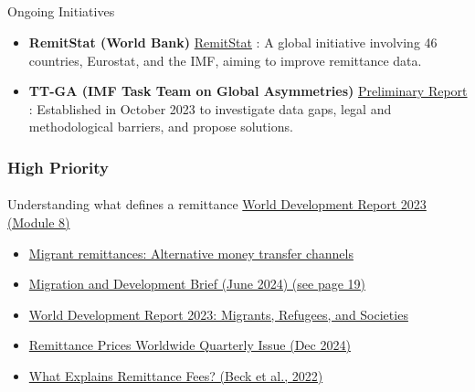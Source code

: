 \documentclass[
  11pt,
]{article}
\makeatletter
\let\oldparagraph\paragraph
\renewcommand{\paragraph}{
    \@ifstar
      \xxxParagraphStar
      \xxxParagraphNoStar
  }
\newcommand{\xxxParagraphStar}[1]{\oldparagraph*{#1}\mbox{}}
\newcommand{\xxxParagraphNoStar}[1]{\oldparagraph{#1}\mbox{}}
\let\oldsubparagraph\subparagraph
\renewcommand{\subparagraph}{
    \@ifstar
      \xxxSubParagraphStar
      \xxxSubParagraphNoStar
  }
\newcommand{\xxxSubParagraphStar}[1]{\oldsubparagraph*{#1}\mbox{}}
\newcommand{\xxxSubParagraphNoStar}[1]{\oldsubparagraph{#1}\mbox{}}
\providecommand{\tightlist}{%
  \setlength{\itemsep}{0pt}\setlength{\parskip}{0pt}}
\makeatother
\begin{document}
\subparagraph{Ongoing Initiatives}\label{ongoing-initiatives}

\begin{itemize}
\tightlist
\item
  \textbf{RemitStat (World Bank)}
  \href{https://blogs.worldbank.org/en/peoplemove/improving-data-on-remittances--remitstat}{RemitStat}
  : A global initiative involving 46 countries, Eurostat, and the IMF,
  aiming to improve remittance data.
\item
  \textbf{TT-GA (IMF Task Team on Global Asymmetries)}
  \href{https://www.imf.org/external/pubs/ft/bop/2024/pdf/44/BOPCOM\%2024-08\%20-\%20Report\%20of\%20the\%20Task\%20Team\%20on\%20Global\%20Asymmetries\%20\%20Progress\%20and\%20Work\%20Plan\%20for\%202025.pdf}{Preliminary
  Report} : Established in October 2023 to investigate data gaps, legal
  and methodological barriers, and propose solutions.
\end{itemize}

\subsubsection{High Priority}\label{high-priority}

\paragraph{\texorpdfstring{Understanding what defines a remittance
\href{https://www.worldbank.org/en/publication/wdr2023/brief/module-8-remittances}{World
Development Report 2023 (Module
8)}}{Understanding what defines a remittance World Development Report 2023 (Module 8)}}\label{understanding-what-defines-a-remittance-world-development-report-2023-module-8}

\begin{itemize}
\item
  \href{https://drive.google.com/file/d/1LL87PIen7uBg9XGSSDZkeXzUWA_HbOCt/view?usp=sharing}{Migrant
  remittances: Alternative money transfer channels}
\item
  \href{https://documents1.worldbank.org/curated/en/099714008132436612/pdf/IDU1a9cf73b51fcad1425a1a0dd1cc8f2f3331ce.pdf\#page=19}{Migration
  and Development Brief (June 2024) (see page 19)}
\item
  \href{https://openknowledge.worldbank.org/server/api/core/bitstreams/6d4f883a-f89d-4fc1-8753-47fb683a3f33/content}{World
  Development Report 2023: Migrants, Refugees, and Societies}
\item
  \href{https://remittanceprices.worldbank.org/sites/default/files/rpw_main_report_and_annex_q424_13.pdf}{Remittance
  Prices Worldwide Quarterly Issue (Dec 2024)}
\item
  \href{https://drive.google.com/file/d/1u0iM0rzaXon-ZQFzc-sfElIgMU54tS8d/view?usp=sharing}{What
  Explains Remittance Fees? (Beck et al., 2022)}
\end{itemize}
\end{document}
